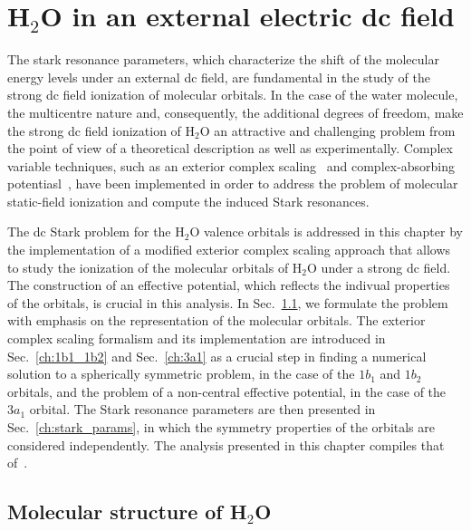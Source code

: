 \chapter{H$_{2}$O in an external electric dc field}
\label{cha:dc_h2o}


The stark resonance parameters, which characterize the shift of the
molecular energy levels under an external dc field, are fundamental in
the study of the strong dc field ionization of molecular orbitals. In
the case of the water molecule, the multicentre nature and,
consequently, the additional degrees of freedom, make the strong dc
field ionization of H$_{2}$O an attractive and challenging problem
from the point of view of a theoretical description as well as
experimentally. Complex variable techniques, such as an exterior
complex scaling~\cite{Simon_1979,Scrinzi_2010} and complex-absorbing
potentiasl~\cite{RissMeyer_1993,Krause_2014}, have been implemented in
order to address the problem of molecular static-field ionization and
compute the induced Stark resonances.

The dc Stark problem for the H$_{2}$O valence orbitals is addressed in
this chapter by the implementation of a modified exterior complex
scaling approach that allows to study the ionization of the molecular
orbitals of H$_{2}$O under a strong dc field. The construction of an
effective potential, which reflects the indivual properties of the
orbitals, is crucial in this analysis. In Sec.~\ref{ch:h2o_structure},
we formulate the problem with emphasis on the representation of the
molecular orbitals. The exterior complex scaling formalism and its
implementation are introduced in Sec.~\ref{ch:1b1_1b2} and
Sec.~\ref{ch:3a1} as a crucial step in finding a numerical solution to
a spherically symmetric problem, in the case of the $1b_{1}$ and
$1b_{2}$ orbitals, and the problem of a non-central effective
potential, in the case of the $3a_{1}$ orbital. The Stark resonance
parameters are then presented in Sec.~\ref{ch:stark_params}, in which
the symmetry properties of the orbitals are considered
independently. The analysis presented in this chapter compiles that
of~\cite{sarias_2016,sarias_2017}.


\section{Molecular structure of H$_{2}$O}
\label{ch:h2o_structure}

